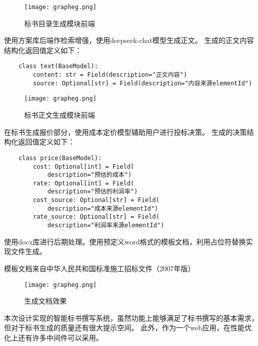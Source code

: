\documentclass{xmu}
\begin{document}
    \begin{figure}[!htb]
        \centering
        \texttt{[image: grapheg.png]}\\
        \caption{标书目录生成模块前端
        }\label{mulu}
    \end{figure}

    使用方案库后端作检索增强，使用deepseek-chat模型生成正文。
    生成的正文内容结构化返回值定义如下：
    \begin{verbatim}
    class text(BaseModel):
        content: str = Field(description="正文内容")
        source: Optional[str] = Field(description="内容来源elementId")
    \end{verbatim}

    \begin{figure}[!htb]
        \centering
        \texttt{[image: grapheg.png]}\\
        \caption{标书正文生成模块前端
        }\label{content}
    \end{figure}

    在标书生成报价部分，使用成本定价模型辅助用户进行投标决策。
    生成的决策结构化返回值定义如下：
    \begin{verbatim}
    class price(BaseModel):
        cost: Optional[int] = Field(
            description="预估的成本")
        rate: Optional[int] = Field(
            description="预估的利润率")
        cost_source: Optional[str] = Field(
            description="成本来源elementId")
        rate_source: Optional[str] = Field(
            description="利润率来源elementId")
    \end{verbatim}

    使用docx库进行后期处理。使用预定义word格式的模板文档，利用占位符替换实现文件生成。

    模板文档来自中华人民共和国标准施工招标文件（2007年版）

    \begin{figure}[!htb]
        \centering
        \texttt{[image: grapheg.png]}\\
        \caption{生成文档效果
        }\label{text}
    \end{figure}
本次设计实现的智能标书撰写系统，虽然功能上能够满足了标书撰写的基本需求，
但对于标书生成的质量还有很大提示空间。
此外，作为一个web应用，在性能优化上还有许多中间件可以采用。
\end{document}
